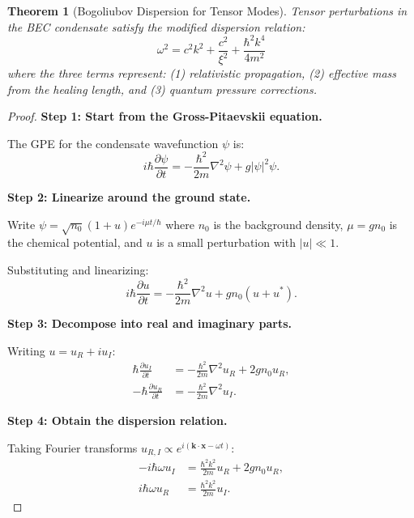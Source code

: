 \documentclass[11pt,a4paper]{article}
\newtheorem{theorem}{Theorem}[section]
\theoremstyle{definition}
\theoremstyle{remark}
\begin{document}
\begin{theorem}[Bogoliubov Dispersion for Tensor Modes]
\label{thm:bogoliubov}
Tensor perturbations in the BEC condensate satisfy the modified dispersion relation:
\begin{equation}
\label{eq:bogoliubov_dispersion}
\boxed{\omega^2 = c^2 k^2 + \frac{c^2}{\xi^2} + \frac{\hbar^2 k^4}{4m^2}}
\end{equation}
where the three terms represent: (1) relativistic propagation, (2) effective mass from the healing length, and (3) quantum pressure corrections.
\end{theorem}

\begin{proof}
\textbf{Step 1: Start from the Gross-Pitaevskii equation.}

The GPE for the condensate wavefunction $\psi$ is:
\begin{equation}
i\hbar\frac{\partial\psi}{\partial t} = -\frac{\hbar^2}{2m}\nabla^2\psi + g|\psi|^2\psi.
\end{equation}

\textbf{Step 2: Linearize around the ground state.}

Write $\psi = \sqrt{n_0}(1 + u)e^{-i\mu t/\hbar}$ where $n_0$ is the background density, $\mu = gn_0$ is the chemical potential, and $u$ is a small perturbation with $|u| \ll 1$.

Substituting and linearizing:
\begin{equation}
i\hbar\frac{\partial u}{\partial t} = -\frac{\hbar^2}{2m}\nabla^2 u + gn_0(u + u^*).
\end{equation}

\textbf{Step 3: Decompose into real and imaginary parts.}

Writing $u = u_R + iu_I$:
\begin{align}
\hbar\frac{\partial u_I}{\partial t} &= -\frac{\hbar^2}{2m}\nabla^2 u_R + 2gn_0 u_R, \\
-\hbar\frac{\partial u_R}{\partial t} &= -\frac{\hbar^2}{2m}\nabla^2 u_I.
\end{align}

\textbf{Step 4: Obtain the dispersion relation.}

Taking Fourier transforms $u_{R,I} \propto e^{i(\mathbf{k}\cdot\mathbf{x} - \omega t)}$:
\begin{align}
-i\hbar\omega u_I &= \frac{\hbar^2 k^2}{2m}u_R + 2gn_0 u_R, \\
i\hbar\omega u_R &= \frac{\hbar^2 k^2}{2m}u_I.
\end{align}


\end{proof}
\end{document}
